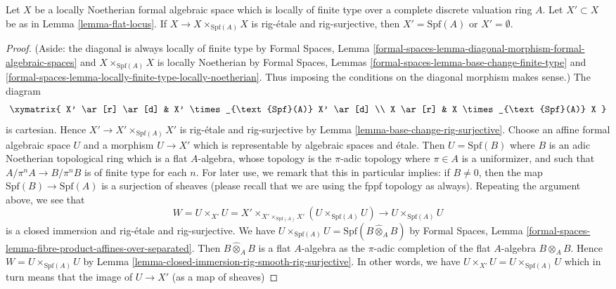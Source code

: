 \begin{lemma}
\label{lemma-flat-and-diagonal-rig-surjective}
Let $X$ be a locally Noetherian formal algebraic space which is
locally of finite type over a complete discrete valuation ring $A$.
Let $X' \subset X$ be as in Lemma \ref{lemma-flat-locus}.
If $X \to X \times_{\text{Spf}(A)} X$ is rig-\'etale and rig-surjective,
then $X' = \text{Spf}(A)$ or $X' = \emptyset$.
\end{lemma}

\begin{proof}
(Aside: the diagonal is always locally of finite type by
Formal Spaces, Lemma
\ref{formal-spaces-lemma-diagonal-morphism-formal-algebraic-spaces}
and $X \times_{\text{Spf}(A)} X$ is locally Noetherian by
Formal Spaces, Lemmas
\ref{formal-spaces-lemma-base-change-finite-type} and
\ref{formal-spaces-lemma-locally-finite-type-locally-noetherian}.
Thus imposing the conditions on the diagonal morphism makes sense.)
The diagram
$$
\xymatrix{
X' \ar[r] \ar[d] & X' \times_{\text{Spf}(A)} X' \ar[d] \\
X \ar[r] & X \times_{\text{Spf}(A)} X
}
$$
is cartesian. Hence $X' \to X' \times_{\text{Spf}(A)} X'$
is rig-\'etale and rig-surjective by
Lemma \ref{lemma-base-change-rig-surjective}.
Choose an affine formal algebraic space $U$ and a morphism
$U \to X'$ which is representable by algebraic spaces and \'etale.
Then $U = \text{Spf}(B)$ where $B$ is an adic Noetherian topological ring
which is a flat $A$-algebra, whose topology is the $\pi$-adic
topology where $\pi \in A$ is a uniformizer, and such that
$A/\pi^n A \to B/\pi^n B$ is of finite type for each $n$.
For later use, we remark that this in particular implies: if $B \not = 0$,
then the map $\text{Spf}(B) \to \text{Spf}(A)$ is a surjection
of sheaves (please recall that we are using the fppf topology
as always). Repeating the argument above, we see that
$$
W = U \times_{X'} U =
X' \times_{X' \times_{\text{Spf}(A)} X'} (U \times_{\text{Spf}(A)} U)
\longrightarrow
U \times_{\text{Spf}(A)} U
$$
is a closed immersion and rig-\'etale and rig-surjective. We have
$U \times_{\text{Spf}(A)} U = \text{Spf}(B \widehat{\otimes}_A B)$
by Formal Spaces, Lemma
\ref{formal-spaces-lemma-fibre-product-affines-over-separated}.
Then $B \widehat{\otimes}_A B$ is a flat $A$-algebra
as the $\pi$-adic completion of the flat $A$-algebra $B \otimes_A B$.
Hence $W = U \times_{\text{Spf}(A)} U$ by
Lemma \ref{lemma-closed-immersion-rig-smooth-rig-surjective}.
In other words, we have $U \times_{X'} U = U \times_{\text{Spf}(A)} U$
which in turn means that the image of $U \to X'$ (as a map of sheaves)

\end{proof}
